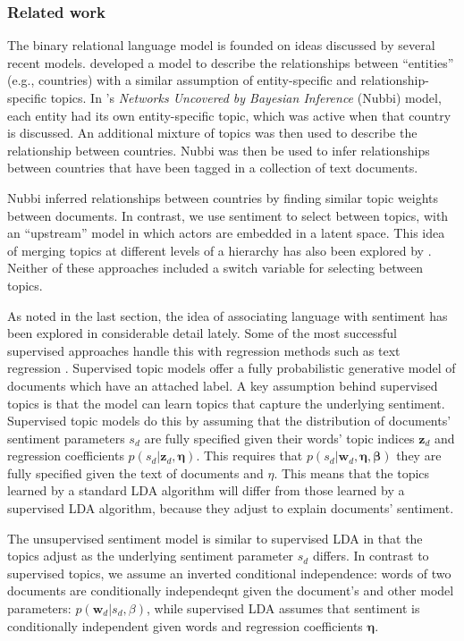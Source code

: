 \subsubsection{Related work}
The binary relational language model is founded on ideas discussed by
several recent models.  \cite{chang:2009nubbi} developed a model to
describe the relationships between ``entities'' (e.g., countries) with
a similar assumption of entity-specific and relationship-specific
topics. In \cite{chang:2009nubbi}'s \emph{Networks Uncovered by Bayesian
  Inference} (Nubbi) model, each entity had its own entity-specific
topic, which was active when that country is discussed.  An additional
mixture of topics was then used to describe the relationship between
countries.  Nubbi was then be used to infer relationships between
countries that have been tagged in a collection of text documents.

Nubbi inferred relationships between countries by finding similar
topic weights between documents. In contrast, we use sentiment to
select between topics, with an ``upstream'' model in which actors are
embedded in a latent space. This idea of merging topics at different
levels of a hierarchy has also been explored by
\cite{chemudugunta:2009}.  Neither of these approaches included a
switch variable for selecting between topics.

As noted in the last section, the idea of associating language with
sentiment has been explored in considerable detail lately.  Some of
the most successful supervised approaches handle this with regression
methods such as text regression \citep{kogan:2009}. Supervised topic
models \citep{blei:2008} offer a fully probabilistic generative model
of documents which have an attached label.  A key assumption behind
supervised topics is that the model can learn topics that capture the
underlying sentiment.  Supervised topic models do this by assuming
that the distribution of documents' sentiment parameters $s_d$ are
fully specified given their words' topic indices $\bm z_d$ and
regression coefficients $p(s_d | \bm z_d, \bm \eta)$.  This requires
that $p(s_d | \bm w_d, \bm \eta, \bm \beta)$ they are fully specified
given the text of documents and $\eta$. This means that the topics
learned by a standard LDA algorithm will differ from those learned by
a supervised LDA algorithm, because they adjust to explain documents'
sentiment.

The unsupervised sentiment model is similar to supervised LDA in that
the topics adjust as the underlying sentiment parameter $s_d$ differs.
In contrast to supervised topics, we assume an inverted conditional
independence: words of two documents are conditionally independeqnt
given the document's and other model parameters: $p(\bm w_d | s_d,
\beta)$, while supervised LDA assumes that sentiment is conditionally
independent given words and regression coefficients $\bm \eta$.

